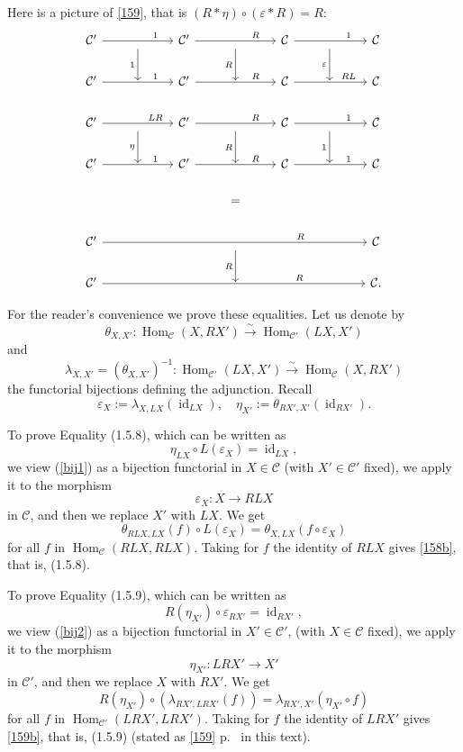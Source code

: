 \documentclass[12pt]{article}
\theoremstyle{remark}%
\newcommand{\C}{\mathcal C}
\newcommand{\e}{\varepsilon}
\DeclareMathOperator{\id}{id}
\DeclareMathOperator{\Hom}{Hom}
\begin{document}
Here is a picture of \eqref{159}, that is $(R*\eta)\circ(\e*R)=R$: 
$$
\begin{tikzcd}
%
\C'\ar{rr}{}[near end]{1}&\ar{d}[swap]{1}&\C'\ar{rr}{}[near end]{R}&\ar{d}[swap]{R}&\C\ar{rr}{}[near end]{1}&\ar{d}[swap]{\e}&\C\\ 
%
\C'\ar{rr}{}[near end]{1}&{}&\C'\ar{rr}{}[near end]{R}&{}&\C\ar{rr}{}[near end]{RL}&{}&\C\\ 
%
\C'\ar{rr}{}[near end]{LR}&\ar{d}[swap]{\eta}&\C'\ar{rr}{}[near end]{R}&\ar{d}[swap]{R}&\C\ar{rr}{}[near end]{1}&\ar{d}[swap]{1}&\C\\ 
%
\C'\ar{rr}{}[near end]{1}&{}&\C'\ar{rr}{}[near end]{R}&{}&\C\ar{rr}{}[near end]{1}&{}&\C\\ 
%
&&&=\\ 
%
\C'\ar{rrrrrr}[near end]{R}&&&{}\ar{d}[swap]{R}&&&\C\\
%
\C'\ar{rrrrrr}[near end]{R}&&&{}&&&\C.
%
\end{tikzcd}
$$ 

For the reader's convenience we prove these equalities. Let us denote by 
%
\begin{equation}\label{bij1}
\theta_{X,X'}:\Hom_\C(X,RX')\overset\sim\to\Hom_{\C'}(LX,X')
\end{equation} 
% 
and 
% 
\begin{equation}\label{bij2}
\lambda_{X,X'}=(\theta_{X,X'})^{-1}:\Hom_{\C'}(LX,X')\overset\sim\to\Hom_\C(X,RX')
\end{equation} 
% 
the functorial bijections defining the adjunction. Recall 
$$
\e_X:=\lambda_{X,LX}(\id_{LX}),\quad\eta_{X'}:=\theta_{RX',X'}(\id_{RX'}).
$$ 

To prove Equality (1.5.8), which can be written as 
% 
\begin{equation}\label{158b} 
\eta_{LX}\circ L(\e_X)=\id_{LX}, 
\end{equation}
% 
we view (\ref{bij1}) as a bijection functorial in $X\in\C$ (with $X'\in\C'$ fixed), we apply it to the morphism 
$$
\e_X:X\to RLX
$$ 
in $\C$, and then we replace $X'$ with $LX$. We get 
$$
\theta_{RLX,LX}(f)\circ L(\e_X)=\theta_{X,LX}(f\circ\e_X)
$$
for all $f$ in $\Hom_\C(RLX,RLX)$. Taking for $f$ the identity of $RLX$ gives \eqref{158b}, that is, (1.5.8).

To prove Equality (1.5.9), which can be written as 
%
\begin{equation}\label{159b} 
R(\eta_{X'})\circ\e_{RX'}=\id_{RX'},
\end{equation}
% 
we view (\ref{bij2}) as a bijection functorial in $X'\in\C'$, (with $X\in\C$ fixed), we apply it to the morphism 
$$
\eta_{X'}:LRX'\to X'
$$ 
in $\C'$, and then we replace $X$ with $RX'$. We get 
$$
R(\eta_{X'})\circ(\lambda_{RX',LRX'}(f))=\lambda_{RX',X'}(\eta_{X'}\circ f)
$$
for all $f$ in $\Hom_{\C'}(LRX',LRX')$. Taking for $f$ the identity of $LRX'$ gives \eqref{159b}, that is, (1.5.9) (stated as \eqref{159} p.~\pageref{159} in this text). 
%
% 
\end{document}
